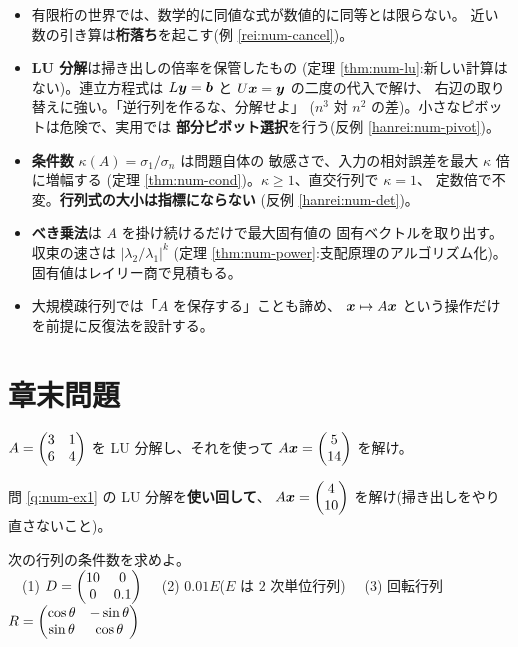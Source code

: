 \begin{matome}
\begin{itemize}
\item 有限桁の世界では、数学的に同値な式が数値的に同等とは限らない。
近い数の引き算は\textbf{桁落ち}を起こす(例 \ref{rei:num-cancel})。
\item \textbf{LU 分解}は掃き出しの倍率を保管したもの
(定理 \ref{thm:num-lu}:新しい計算はない)。連立方程式は
$L\bm{y} = \bm{b}$ と $U\bm{x} = \bm{y}$ の二度の代入で解け、
右辺の取り替えに強い。「逆行列を作るな、分解せよ」
($n^3$ 対 $n^2$ の差)。小さなピボットは危険で、実用では
\textbf{部分ピボット選択}を行う(反例 \ref{hanrei:num-pivot})。
\item \textbf{条件数} $\kappa(A) = \sigma_1/\sigma_n$ は問題自体の
敏感さで、入力の相対誤差を最大 $\kappa$ 倍に増幅する
(定理 \ref{thm:num-cond})。$\kappa \ge 1$、直交行列で $\kappa = 1$、
定数倍で不変。\textbf{行列式の大小は指標にならない}
(反例 \ref{hanrei:num-det})。
\item \textbf{べき乗法}は $A$ を掛け続けるだけで最大固有値の
固有ベクトルを取り出す。収束の速さは $|\lambda_2/\lambda_1|^k$
(定理 \ref{thm:num-power}:支配原理のアルゴリズム化)。
固有値はレイリー商で見積もる。
\item 大規模疎行列では「$A$ を保存する」ことも諦め、
$\bm{x} \mapsto A\bm{x}$ という操作だけを前提に反復法を設計する。
\end{itemize}
\end{matome}

\section*{章末問題}

\begin{mondai}[基本]\label{q:num-ex1}
$A = \begin{pmatrix}3 & 1 \\ 6 & 4\end{pmatrix}$ を LU 分解し、それを使って
$A\bm{x} = \begin{pmatrix}5 \\ 14\end{pmatrix}$ を解け。
\end{mondai}

\begin{mondai}[基本]\label{q:num-ex2}
問 \ref{q:num-ex1} の LU 分解を\textbf{使い回して}、
$A\bm{x} = \begin{pmatrix}4 \\ 10\end{pmatrix}$ を解け(掃き出しをやり直さないこと)。
\end{mondai}

\begin{mondai}[基本]\label{q:num-ex3}
次の行列の条件数を求めよ。\\
　(1) $D = \begin{pmatrix}10 & 0 \\ 0 & 0.1\end{pmatrix}$
　(2) $0.01E$($E$ は $2$ 次単位行列)
　(3) 回転行列 $R = \begin{pmatrix}\cos\theta & -\sin\theta \\
\sin\theta & \cos\theta\end{pmatrix}$
\end{mondai}

